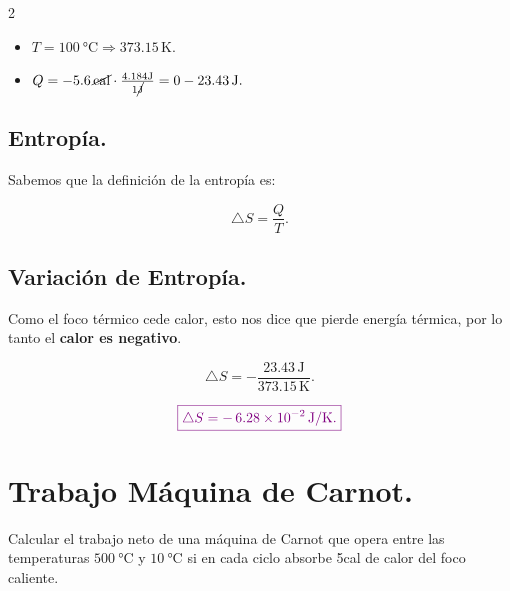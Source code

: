 \documentclass[a4paper,12pt]{article} %
\begin{document}
\begin{multicols}{2}
    \begin{itemize}
        \item \( T = \SI{100}{\degreeCelsius} \Rightarrow 373.15 \, \mathrm{K}. \)
        \item \( Q = - 5.6 \, \cancel{\mathrm{cal}} \cdot \frac{4.184 \mathrm{J}}{ 1 \cancel{\mathrm{J}}} = 0-23.43 \, \mathrm{J}.  \)
    \end{itemize}
\end{multicols}

\vspace{\baselineskip}

\subsection{Entropía.}

\begin{justify}
    Sabemos que la definición de la entropía es:
\end{justify}

\[ \triangle S = \frac{Q}{T}. \]

\vspace{\baselineskip}

\subsection{Variación de Entropía.}

\begin{justify}
    Como el foco térmico cede calor, esto nos dice que pierde energía térmica, por lo tanto el \textbf{calor es negativo}.
\end{justify}

\[ \triangle S = - \frac{23.43 \, \mathrm{J}}{373.15 \, \mathrm{K}}. \]

\vspace{\baselineskip}

\[ \textcolor{violet}{\boxed{ \triangle S = - \, 6.28 \times 10^{-2} \, \mathrm{J}/\mathrm{K}. }} \]

\section{Trabajo Máquina de Carnot.}

\begin{justify}
    Calcular el trabajo neto de una máquina de Carnot que opera entre las temperaturas \( \SI{500}{\degreeCelsius} \) y \( \SI{10}{\degreeCelsius}\) si en cada ciclo absorbe 5cal de calor del foco caliente.
\end{justify}
\end{document}
